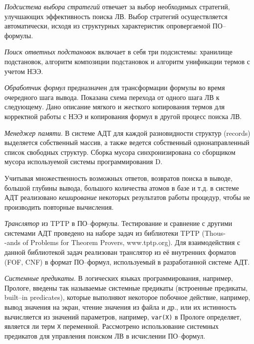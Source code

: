 \documentclass[a4paper]{report}
\begin{document}
\emph{Подсистема выбора стратегий} отвечает за выбор необходимых стратегий, улучшающих эффективность поиска ЛВ. Выбор стратегий осуществляется автоматически, исходя из структурных характеристик опровергаемой ПО--формулы. %

\emph{Поиск ответных подстановок} включает в себя три подсистемы: хранилище подстановок, алгоритм композиции подстановок и алгоритм унификации термов с учетом НЭЭ.

\emph{Обработчик формул} предназначен для трансформации формулы во время очередного шага вывода. Показана схема перехода от одного шага ЛВ к следующему. Дано описание мягкого и жесткого копирования термов для корректной работы с НЭЭ и копирования формул в другой процесс поиска ЛВ.

\emph{Менеджер памяти}. В системе АДТ для каждой разновидности структур (records) выделяется собственный массив, а также ведется собственный однонаправленный список свободных структур. Сборка мусора синхронизирована со сборщиком мусора используемой системы программирования D.

Учитывая множественность возможных ответов, возвратов поиска в выводе, большой глубины вывода, большого количества атомов в базе и т.д. в системе АДТ реализовано \emph{кеширование} некоторых результатов работы процедур, чтобы не производить повторные вычисления.

\emph{Транслятор} из TPTP в ПО--формулы. Тестирование и сравнение с другими системами АДТ проведено на наборе задач из библиотеки TPTP (Thous-\\-ands of Problems for Theorem Provers, www.tptp.org). Для взаимодействия с данной библиотекой задач реализован транслятор из её внутренних форматов (FOF, CNF) в формат ПО--формул, используемый в разработанной системе АДТ.

\emph{Системные предикаты}. В логических языках программирования, например, Прологе, введены так называемые системные предикаты (встроенные предикаты, built--in predicates), которые выполняют некоторое побочное действие, например, вывод значения на экран, чтение значения из файла и др., или их истинность вычисляется из значений параметров, например, \texttt{var(X)} в Прологе определяет, является ли терм \texttt{X} переменной. Рассмотрено использование системных предикатов для управления поиском ЛВ в исчислении ПО--формул.
\end{document}

